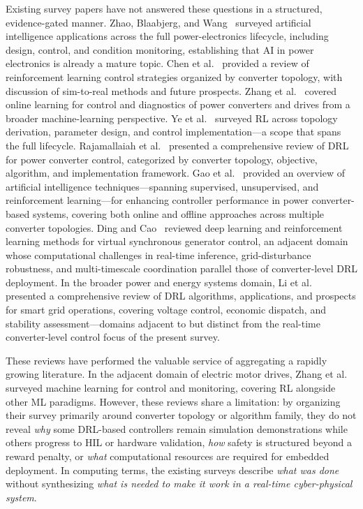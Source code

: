 \documentclass[manuscript,screen,review]{acmart}
\begin{document}
Existing survey papers have not answered these questions in a structured, evidence-gated manner.
Zhao, Blaabjerg, and Wang~\cite{zhao2021overview} surveyed artificial intelligence applications across the full power-electronics lifecycle, including design, control, and condition monitoring, establishing that AI in power electronics is already a mature topic.
Chen et al.~\cite{chen2024review} provided a review of reinforcement learning control strategies organized by converter topology, with discussion of sim-to-real methods and future prospects.
Zhang et al.~\cite{zhang2023online} covered online learning for control and diagnostics of power converters and drives from a broader machine-learning perspective.
Ye et al.~\cite{ye2026overview} surveyed RL across topology derivation, parameter design, and control implementation---a scope that spans the full lifecycle.
Rajamallaiah et al.~\cite{rajamallaiah2025deep} presented a comprehensive review of DRL for power converter control, categorized by converter topology, objective, algorithm, and implementation framework.
Gao et al.~\cite{gao2023artificial} provided an overview of artificial intelligence techniques---spanning supervised, unsupervised, and reinforcement learning---for enhancing controller performance in power converter-based systems, covering both online and offline approaches across multiple converter topologies.
Ding and Cao~\cite{ding2024deep} reviewed deep learning and reinforcement learning methods for virtual synchronous generator control, an adjacent domain whose computational challenges in real-time inference, grid-disturbance robustness, and multi-timescale coordination parallel those of converter-level DRL deployment.
In the broader power and energy systems domain, Li et al.~\cite{li2023deep} presented a comprehensive review of DRL algorithms, applications, and prospects for smart grid operations, covering voltage control, economic dispatch, and stability assessment---domains adjacent to but distinct from the real-time converter-level control focus of the present survey.

These reviews have performed the valuable service of aggregating a rapidly growing literature.
In the adjacent domain of electric motor drives, Zhang et al.~\cite{zhang2021machine} surveyed machine learning for control and monitoring, covering RL alongside other ML paradigms.
However, these reviews share a limitation: by organizing their survey primarily around converter topology or algorithm family, they do not reveal \emph{why} some DRL-based controllers remain simulation demonstrations while others progress to HIL or hardware validation, \emph{how} safety is structured beyond a reward penalty, or \emph{what} computational resources are required for embedded deployment.
In computing terms, the existing surveys describe \emph{what was done} without synthesizing \emph{what is needed to make it work in a real-time cyber-physical system}.
\end{document}
